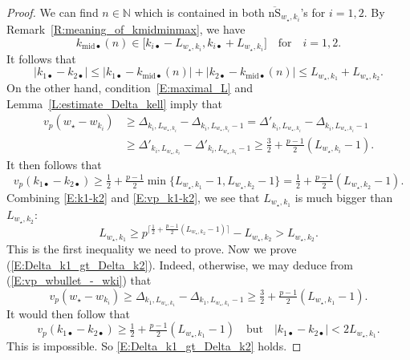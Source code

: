 \begin{proof}
    We can find $n\in {\mathbb{N}}$ which is contained in both $\overline {\mathrm{nS}}_{w_\star, k_i}$'s for $i=1,2$. By Remark~\ref{R:meaning_of_kmidminmax}, we have
    	$$
    	k_{{\mathrm{mid}}\bullet}(n) \in \big[k_{i\bullet} -L_{w_\star, k_i}, k_{i\bullet} +L_{w_\star, k_i}\big] \quad \textrm{for} \quad i = 1,2.
    	$$
    	It follows that
    	\begin{equation}
    	\label{E:k1-k2}
    	|k_{1\bullet} - k_{2\bullet}| \leq |k_{1\bullet}-k_{{\mathrm{mid}}\bullet}(n)| + |k_{2\bullet}-k_{{\mathrm{mid}}\bullet}(n)|\leq L_{w_\star, k_1} + L_{w_\star, k_2}.
    	\end{equation}
    	On the other hand, condition~\eqref{E:maximal_L} and Lemma~\ref{L:estimate_Delta_kell} imply that
    	\begin{align}
    	\label{E:vp_wbullet_-_wki}
    	v_p(w_\star - w_{k_i}) &\geq \Delta_{k_i, L_{w_\star, k_i}} - \Delta_{k_i, L_{w_\star, k_i}-1} =\Delta'_{k_i, L_{w_\star, k_i}} - \Delta_{k_i, L_{w_\star, k_i}-1} \\ &\geq \Delta'_{k_i, L_{w_\star, k_i}} - \Delta'_{k_i, L_{w_\star, k_i}-1} \geq \tfrac 32+ \tfrac {p-1}2 (L_{w_\star, k_i} - 1) .\nonumber
    	\end{align}
    	It then follows that
    	\begin{equation}
    	\label{E:vp_k1-k2}
    	v_p(k_{1\bullet} - k_{2\bullet}) \geq \tfrac 12+\tfrac{p-1}2\min\big\{L_{w_\star, k_1} - 1, L_{w_\star, k_2} - 1\big\} = \tfrac 12+\tfrac{p-1}2( L_{w_\star, k_2} - 1).
    	\end{equation}
    	Combining \eqref{E:k1-k2} and \eqref{E:vp_k1-k2}, we see that $L_{w_\star, k_1} $ is much bigger than $L_{w_\star, k_2}$:
    	$$
    	L_{w_\star, k_1}  \geq p^{\lceil\frac 12 + \frac{p-1}2(L_{w_\star, k_2}-1) \rceil} - L_{w_\star, k_2} > L_{w_\star, k_2} .
    	$$
    	This is the first inequality we need to prove. Now we prove (\ref{E:Delta_k1_gt_Delta_k2}). Indeed, otherwise, we may deduce from (\ref{E:vp_wbullet_-_wki}) that
    	\[
    	v_p(w_\star - w_{k_i}) \geq \Delta_{k_1, L_{w_\star, k_1}}
    	- \Delta_{k_1, L_{w_\star, k_1}-1} \geq \tfrac 32 + \tfrac{p-1}2(L_{w_\star, k_1}-1).
    	\]
    	It would then follow that
    	$$
    	v_p(k_{1\bullet}-k_{2\bullet}) \geq \tfrac 12 + \tfrac{p-1}2(L_{w_\star, k_1}-1) \quad \textrm{but}\quad |k_{1\bullet} - k_{2\bullet}| < 2L_{w_\star, k_1}.
    	$$
    	This is impossible. So \eqref{E:Delta_k1_gt_Delta_k2} holds.
\end{proof}

